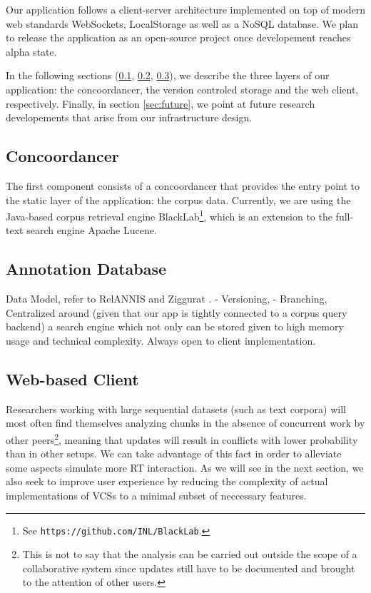 \documentclass{sig-alternate}
\begin{document}
Our application follows a client-server architecture implemented on top of modern web standards
\textemdash WebSockets, LocalStorage \textemdash as well as a NoSQL database.
We plan to release the application as an open-source project once developement reaches alpha state.

In the following sections (\ref{subsec:conc}, \ref{subsec:db}, \ref{subsec:client}), we describe
the three layers of our application: the concoordancer, the version controled storage and the
web client, respectively. Finally, in section \ref{sec:future}, we point at future research
developements that arise from our infrastructure design.

\subsection{Concoordancer}\label{subsec:conc}
The first component consists of a concoordancer that provides the entry point to the static
layer of the application: the corpus data. Currently, we are using the Java-based corpus retrieval
engine BlackLab\footnote{
  See \texttt{https://github.com/INL/BlackLab}.
}, which is an extension to the full-text search engine Apache Lucene. 

\subsection{Annotation Database}\label{subsec:db}
Data Model, refer to RelANNIS and Ziggurat \cite{Krause2016,Evert2015}.
- Versioning,
- Branching, Centralized around (given that our app is tightly connected to a corpus query backend)
a search engine which not only can be stored given to high memory usage and technical complexity.
Always open to client implementation.

\subsection{Web-based Client}\label{subsec:client}
Researchers working with large sequential datasets (such as text corpora) will most often find
themselves analyzing chunks in the absence of concurrent work by other peers\footnote{
  This is not to say that the analysis can be carried out outside the scope of a collaborative system
  since updates still have to be documented and brought to the attention of other users.
}, meaning that updates will result in conflicts with lower probability than in other setups.
We can take advantage of this fact in order to alleviate some aspects 
simulate more RT interaction.
As we will see in the next section, we also seek to improve user experience by reducing the
complexity of actual implementations of VCSs to a minimal subset of neccessary features.
\end{document}
